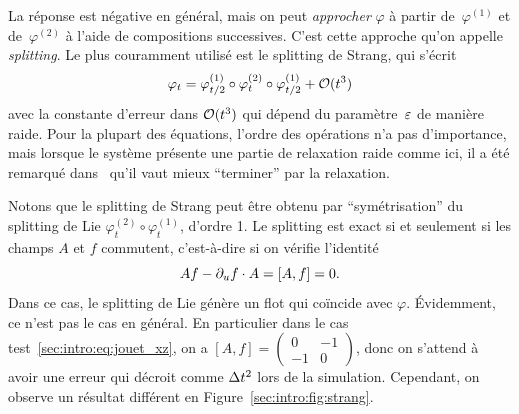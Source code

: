 La réponse est négative en général, mais on peut \textit{approcher} $\varphi$ à partir de~$\varphi^{(1)}$ et de~$\varphi^{(2)}$ à l'aide de compositions successives. C'est cette approche qu'on appelle \textit{splitting}. Le plus couramment utilisé est le splitting de Strang, qui s'écrit 
\begin{equation*}
    \varphi_t = \varphi^{(1)}_{t/2} \circ \varphi^{(2)}_{t} \circ \varphi^{(1)}_{t/2} + \mathcal{O}(t^3) 
\end{equation*}
avec la constante d'erreur dans $\mathcal{O}(t^3)$ qui dépend du paramètre~$\varepsilon$ de manière raide. Pour la plupart des équations, l'ordre des opérations n'a pas d'importance, mais lorsque le système présente une partie de relaxation raide comme ici, il a été remarqué dans~\cite{sportisse.2000.analysis,descombes.2004.operator} qu'il vaut mieux \enquote{terminer} par la relaxation. 

Notons que le splitting de Strang peut être obtenu par \enquote{symétrisation} du splitting de Lie $\varphi^{(2)}_{t} \circ \varphi^{(1)}_{t}$, d'ordre 1. 
Le splitting est exact si et seulement si les champs $A$ et $f$ commutent, c'est-à-dire si on vérifie l'identité 
\begin{equation*}
    Af - \partial_u f \cdot A = [A,f] = 0 .
\end{equation*}
Dans ce cas, le splitting de Lie génère un flot qui coïncide avec $\varphi$. Évidemment, ce n'est pas le cas en général. En particulier dans le cas test~\eqref{sec:intro:eq:jouet_xz}, on a $[A,f] = \begin{pmatrix} 0 & -1 \\ -1 & 0 \end{pmatrix}$, donc on s'attend à avoir une erreur qui décroit comme $\Delta t^2$ lors de la simulation. Cependant, on observe un résultat différent en Figure~\ref{sec:intro:fig:strang}.


